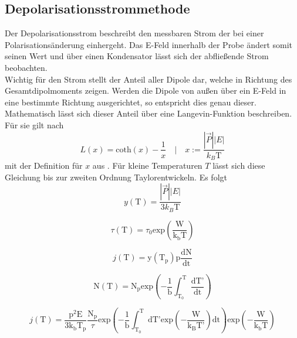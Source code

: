 \subsection{Depolarisationsstrommethode}
Der Depolarisationsstrom beschreibt den messbaren Strom der bei einer Polarisationsänderung einhergeht. Das E-Feld innerhalb der Probe ändert somit seinen Wert und über einen Kondensator lässt sich der abfließende Strom beobachten.
\\
Wichtig für den Strom stellt der Anteil aller Dipole dar, welche in Richtung des Gesamtdipolmoments zeigen. Werden die Dipole von außen über ein E-Feld in eine bestimmte Richtung ausgerichtet, so entspricht dies genau
dieser. Mathematisch lässt sich dieser Anteil über eine Langevin-Funktion beschreiben. Für sie gilt nach \cite{KROGER201577}
\begin{equation}
L(x) = \text{coth}(x) - \frac{1}{x} \quad \Biggl| \quad x := \frac{|\vec{P}||E|}{k_{B} \text{T}}
\end{equation}
mit der Definition für $x$ aus \cite{altskript}. Für kleine Temperaturen $T$ lässt sich diese Gleichung bis zur zweiten Ordnung Taylorentwickeln.
Es folgt
\begin{equation}
y(\text{T}) = \frac{|\vec{P}||E|}{3k_{B} \text{T}} 
\end{equation}

\begin{equation}
\tau \left( \text{T} \right) = \tau_0  \text{exp} \left(\frac{\text{W}}{\text{k}_{\text{b}}\text{T}}\right) 
\label{eqn:relaxo}
\end{equation}

\begin{equation}
j \left( \text{T} \right) = \text{y} \left( \text{T}_{\text{p}}\right) \text{p} \frac{\text{dN}}{\text{dt}}
\label{eqn:dichte}
\end{equation}

\begin{equation}
\text{N}\left( \text{T} \right) = \text{N}_{\text{p}} \text{exp} \left( - \frac{1}{\text{b}} \int^{\text{T}}_{\text{T}_0} \frac{\text{dT'}}{\text{dt}}\right)
\label{eqn:orientierung}
\end{equation}

\begin{equation}
j \left( \text{T} \right) = \frac{\text{p}^2 \text{E}}{3\text{k}_{\text{b}}\text{T}_{\text{p}}} \frac{\text{N}_{\text{p}}}{\tau} \text{exp} \left( -\frac{1}{\text{b}} \int^{\text{T}}_{\text{T}_0} \text{dT'} \text{exp} \left( - \frac{\text{W}}{\text{k}_{\text{B}}\text{T'}} \right) \text{dt} \right) \text{exp} \left(-\frac{\text{W}}{\text{k}_{\text{b}}\text{T}} \right)
\label{killme}
\end{equation}



